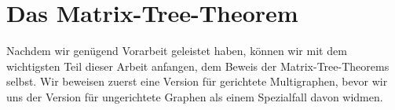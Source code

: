 \section{Das Matrix-Tree-Theorem}

Nachdem wir genügend Vorarbeit geleistet haben, können wir mit dem wichtigsten Teil dieser Arbeit anfangen, dem Beweis der Matrix-Tree-Theorems selbst. Wir beweisen zuerst eine Version für gerichtete Multigraphen, bevor wir uns der Version für ungerichtete Graphen als einem Spezialfall davon widmen.



